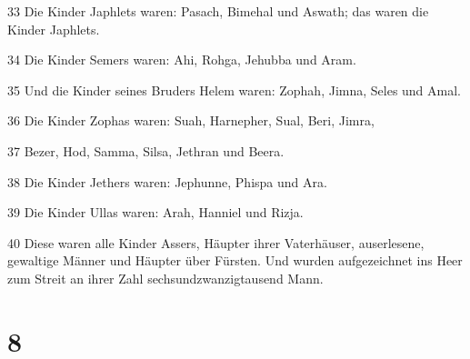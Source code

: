 \par 33 Die Kinder Japhlets waren: Pasach, Bimehal und Aswath; das waren die Kinder Japhlets.
\par 34 Die Kinder Semers waren: Ahi, Rohga, Jehubba und Aram.
\par 35 Und die Kinder seines Bruders Helem waren: Zophah, Jimna, Seles und Amal.
\par 36 Die Kinder Zophas waren: Suah, Harnepher, Sual, Beri, Jimra,
\par 37 Bezer, Hod, Samma, Silsa, Jethran und Beera.
\par 38 Die Kinder Jethers waren: Jephunne, Phispa und Ara.
\par 39 Die Kinder Ullas waren: Arah, Hanniel und Rizja.
\par 40 Diese waren alle Kinder Assers, Häupter ihrer Vaterhäuser, auserlesene, gewaltige Männer und Häupter über Fürsten. Und wurden aufgezeichnet ins Heer zum Streit an ihrer Zahl sechsundzwanzigtausend Mann.

\chapter{8}

